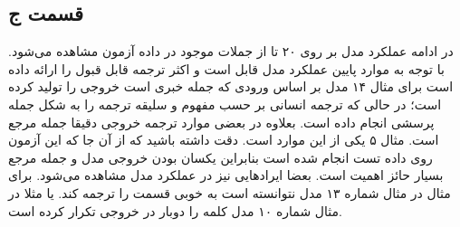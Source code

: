 \documentclass[12pt, a4paper]{book}
\begin{document}
\subsection*{قسمت ج}

در ادامه عملکرد مدل بر روی ۲۰ تا از جملات موجود در داده آزمون مشاهده می‌شود. با توجه به موارد پایین عملکرد مدل قابل
است و اکثر ترجمه قابل قبول را ارائه داده است برای مثال ۱۴ مدل بر اساس ورودی که جمله خبری است خروجی را تولید کرده
است؛ در حالی که ترجمه انسانی بر حسب مفهوم و سلیقه ترجمه را به شکل جمله پرسشی انجام داده است.
بعلاوه در بعضی موارد ترجمه خروجی دقیقا جمله مرجع است. مثال ۵ یکی از این موارد است. دقت داشته باشید که
از آن‌ جا که این آزمون روی داده‌ تست انجام شده است بنابراین یکسان بودن خروجی مدل و جمله مرجع بسیار
حائز اهمیت است. بعضا ایراد‌هایی نیز در عملکرد مدل مشاهده می‌شود.
برای مثال در مثال شماره ۱۳ مدل نتوانسته است به خوبی
قسمت  را ترجمه کند.
یا مثلا در مثال شماره ۱۰ مدل کلمه  را دوبار در خروجی تکرار کرده است.
\end{document}
